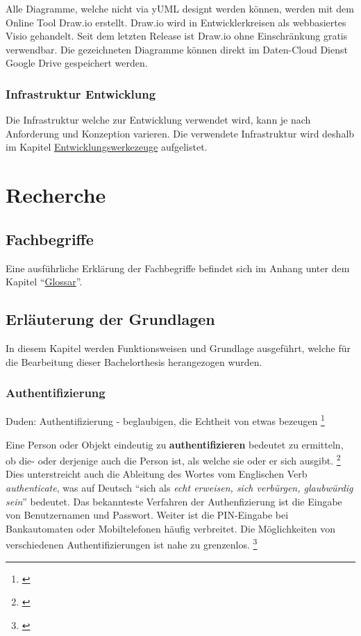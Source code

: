 Alle Diagramme, welche nicht via yUML designt werden können, werden mit
dem Online Tool Draw.io erstellt. Draw.io wird in Entwicklerkreisen als
webbasiertes Visio gehandelt. Seit dem letzten Release ist Draw.io ohne
Einschränkung gratis verwendbar. Die gezeichneten Diagramme können
direkt im Daten-Cloud Dienst Google Drive gespeichert werden.

\subsection{Infrastruktur Entwicklung}\label{infrastruktur-entwicklung}

Die Infrastruktur welche zur Entwicklung verwendet wird, kann je nach
Anforderung und Konzeption varieren. Die verwendete Infrastruktur wird
deshalb im Kapitel
\protect\hyperlink{entwicklungswerkezeuge}{Entwicklungswerkezeuge}
aufgelistet.

\newpage

\chapter{Recherche}\label{recherche}

\section{Fachbegriffe}\label{fachbegriffe}

Eine ausführliche Erklärung der Fachbegriffe befindet sich im Anhang
unter dem Kapitel ``\protect\hyperlink{glossar}{Glossar}''.

\section{Erläuterung der
Grundlagen}\label{erluxe4uterung-der-grundlagen}

In diesem Kapitel werden Funktionsweisen und Grundlage ausgeführt,
welche für die Bearbeitung dieser Bachelorthesis herangezogen wurden.

\hypertarget{authentifizierung}{\subsection{Authentifizierung}\label{authentifizierung}}

Duden: Authentifizierung - beglaubigen, die Echtheit von etwas bezeugen
\footnote{\autocite{duden}}

Eine Person oder Objekt eindeutig zu \textbf{authentifizieren} bedeutet
zu ermitteln, ob die- oder derjenige auch die Person ist, als welche sie
oder er sich ausgibt. \footnote{\autocite{authentifizierungsdef}} Dies
unterstreicht auch die Ableitung des Wortes vom Englischen Verb
\emph{authenticate}, was auf Deutsch ``sich als \emph{echt erweisen,
sich verbürgen, glaubwürdig sein}'' bedeutet. Das bekannteste Verfahren
der Authenfizierung ist die Eingabe von Benutzernamen und Passwort.
Weiter ist die PIN-Eingabe bei Bankautomaten oder Mobiltelefonen häufig
verbreitet. Die Möglichkeiten von verschiedenen Authentifizierungen ist
nahe zu grenzenlos. \footnote{\autocite{authentifizierungsdeforg}}

